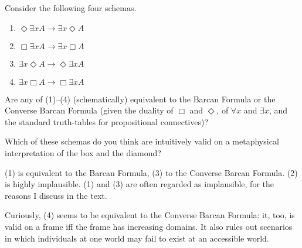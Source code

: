 \begin{exercise}
  Consider the following four schemas.
  \begin{enumerate}[leftmargin=14mm]
    \itemsep-1mm
  \item[(1)] $\Diamond \exists x A \to \exists x \Diamond A$
  \item[(2)] $\Box \exists x A \to \exists x \Box A$
  \item[(3)] $\exists x \Diamond A \to \Diamond \exists x A$
  \item[(4)] $\exists x \Box A \to \Box \exists x A$
  \end{enumerate}
  \vspace{-3mm}
  \begin{exlist}
    \item Are any of (1)--(4) (schematically) equivalent to the Barcan Formula or the Converse
    Barcan Formula (given the duality of $\Box$ and $\Diamond$, of $\forall x$
    and $\exists x$, and the standard truth-tables for propositional
    connectives)?
    \item Which of these schemas do you think are intuitively valid on a
    metaphysical interpretation of the box and the diamond?
  \end{exlist}
\end{exercise}
\begin{solution}
  (1) is equivalent to the Barcan Formula, (3) to the Converse Barcan Formula.
  (2) is highly implausible. (1) and (3) are often regarded as implausible, for
  the reasons I discuss in the text.

  Curiously, (4) seems to be equivalent to the Converse Barcan Formula:
  it, too, is valid on a frame iff the frame has increasing domains.
  It also rules out scenarios in which individuals at one world may fail
  to exist at an accessible world.
\end{solution}  

%
%
%
%
%

